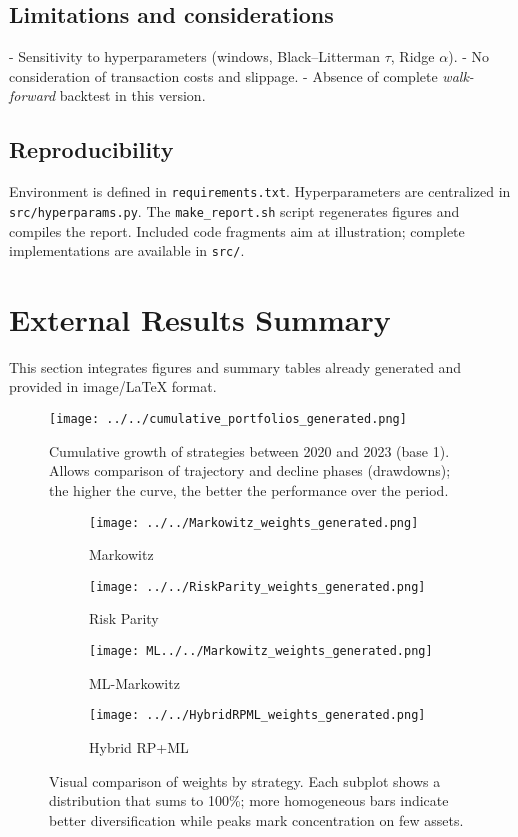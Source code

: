 \documentclass[11pt,a4paper]{article}
\begin{document}
\subsection*{Limitations and considerations}
- Sensitivity to hyperparameters (windows, Black--Litterman \(\tau\), Ridge \(\alpha\)).
- No consideration of transaction costs and slippage.
- Absence of complete \emph{walk-forward} backtest in this version.

\subsection*{Reproducibility}
Environment is defined in \texttt{requirements.txt}. Hyperparameters are centralized in \texttt{src/hyperparams.py}. The \texttt{make\_report.sh} script regenerates figures and compiles the report. Included code fragments aim at illustration; complete implementations are available in \texttt{src/}.

\section*{External Results Summary}
This section integrates figures and summary tables already generated and provided in image/\LaTeX{} format.

\begin{figure}[h]
  \centering
  \texttt{[image: ../../cumulative\_portfolios\_generated.png]}
  \caption{Cumulative growth of strategies between 2020 and 2023 (base 1). Allows comparison of trajectory and decline phases (drawdowns); the higher the curve, the better the performance over the period.}
  \label{fig:cum_external}
\end{figure}

\begin{figure}[h]
  \centering
  \begin{subfigure}[b]{0.48\textwidth}
    \centering
    \texttt{[image: ../../Markowitz\_weights\_generated.png]}
    \caption{Markowitz}
  \end{subfigure}
  \hfill
  \begin{subfigure}[b]{0.48\textwidth}
    \centering
    \texttt{[image: ../../RiskParity\_weights\_generated.png]}
    \caption{Risk Parity}
  \end{subfigure}
  
  \vspace{0.5em}
  \begin{subfigure}[b]{0.48\textwidth}
    \centering
    \texttt{[image: ML../../Markowitz\_weights\_generated.png]}
    \caption{ML-Markowitz}
  \end{subfigure}
  \hfill
  \begin{subfigure}[b]{0.48\textwidth}
    \centering
    \texttt{[image: ../../HybridRPML\_weights\_generated.png]}
    \caption{Hybrid RP+ML}
  \end{subfigure}
  \caption{Visual comparison of weights by strategy. Each subplot shows a distribution that sums to 100\%; more homogeneous bars indicate better diversification while peaks mark concentration on few assets.}
  \label{fig:weights_external}
\end{figure}
\end{document}
